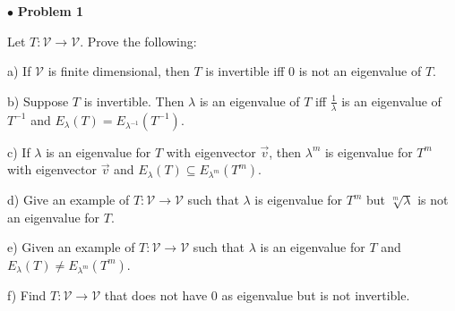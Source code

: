 \documentclass{article}
\begin{document}
$ \bullet$ \textbf{Problem 1}
\medskip

\begin{itshape}
Let $T: \mathcal{V} \to \mathcal{V}$. Prove the following:

a) If $\mathcal{V}$ is finite dimensional, then $T$ is invertible iff 0 is not an eigenvalue of $T$.
\medskip

b) Suppose $T$ is invertible. Then $\lambda$ is an eigenvalue of $T$ iff $\frac{1}{\lambda}$ is an eigenvalue of $T^{-1}$ and $E_{\lambda}(T) = E_{\lambda^{-1}}(T^{-1})$.
\medskip

c) If $\lambda$ is an eigenvalue for $T$ with eigenvector $\vec{v}$, then $\lambda^m$ is eigenvalue for $T^m$ with eigenvector $\vec{v}$ and $E_\lambda(T) \subseteq E_{\lambda^m}(T^m)$.
\medskip

d) Give an example of $T: \mathcal{V} \to \mathcal{V}$ such that $\lambda$ is eigenvalue for $T^m$ but $\sqrt[m]{\lambda}$ is not an eigenvalue for $T$.
\medskip

e) Given an example of $T: \mathcal{V} \to \mathcal{V}$ such that $\lambda$ is an eigenvalue for $T$ and $E_\lambda(T) \ne E_{\lambda^m}(T^m)$.
\medskip

f) Find $T: \mathcal{V} \to \mathcal{V}$ that does not have 0 as eigenvalue but is not invertible. 
\end{itshape}
\medskip
\end{document}

